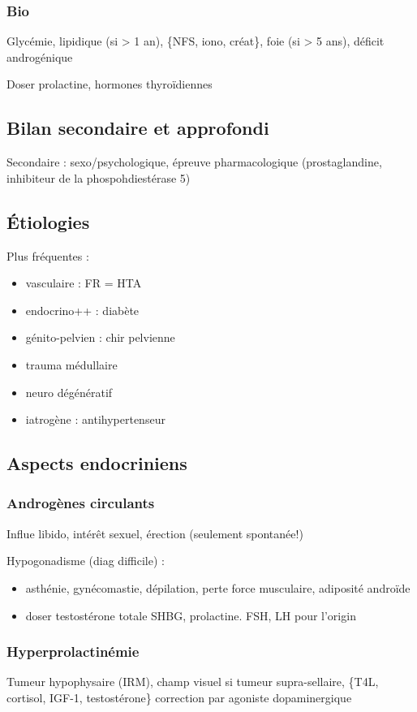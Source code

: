 \documentclass[11pt]{article}
\begin{document}
\subsubsection{Bio}
\label{sec:orge1a72f1}
Glycémie, lipidique (si > 1 an), \{NFS, iono, créat\}, foie (si > 5 ans), déficit
androgénique

Doser prolactine, hormones thyroïdiennes

\subsection{Bilan secondaire et approfondi}
\label{sec:org0fb988a}
Secondaire : sexo/psychologique, épreuve pharmacologique (prostaglandine,
inhibiteur de la phospohdiestérase 5)

\subsection{Étiologies}
\label{sec:orgcdaf2b9}
Plus fréquentes :
\begin{itemize}
\item vasculaire : FR = HTA
\item endocrino++ : diabète
\item génito-pelvien : chir pelvienne
\item trauma médullaire
\item neuro dégénératif
\item iatrogène : antihypertenseur
\end{itemize}

\subsection{Aspects endocriniens}
\label{sec:org017fd89}
\subsubsection{Androgènes circulants}
\label{sec:orgc533955}
Influe libido, intérêt sexuel, érection (seulement spontanée!)

Hypogonadisme (diag difficile) : 
\begin{itemize}
\item asthénie, gynécomastie, dépilation, perte force musculaire, adiposité androïde
\item doser testostérone totale \textpm{} SHBG, prolactine. FSH, LH pour l'origin
\end{itemize}

\subsubsection{Hyperprolactinémie}
\label{sec:orgdf346ba}
Tumeur hypophysaire (IRM), champ visuel si tumeur
supra-sellaire, \{T4L, cortisol, IGF-1, testostérone\}
\thus correction par agoniste dopaminergique
\end{document}
